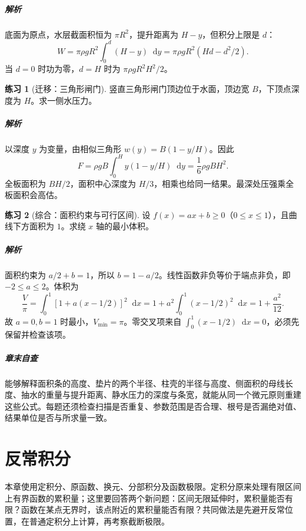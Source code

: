 \documentclass[UTF8,fontset=fandol,12pt,oneside,openany]{ctexrep}
\newcommand{\dd}{\mathop{}\!\mathrm d}
\theoremstyle{definition}
\newtheorem{exercise}{练习}[chapter]
\begin{document}
\paragraph{解析}底面为原点，水层截面积恒为 $\pi R^2$，提升距离为 $H-y$，但积分上限是 $d$：
\[
 W=\pi\rho gR^2\int_0^d(H-y)\dd y
 =\pi\rho gR^2(Hd-d^2/2).
\]
当 $d=0$ 时功为零，$d=H$ 时为 $\pi\rho gR^2H^2/2$。

\begin{exercise}[迁移：三角形闸门]
竖直三角形闸门顶边位于水面，顶边宽 $B$，下顶点深度为 $H$。求一侧水压力。
\end{exercise}
\paragraph{解析}以深度 $y$ 为变量，由相似三角形 $w(y)=B(1-y/H)$。因此
\[
 F=\rho gB\int_0^Hy(1-y/H)\dd y
 =\frac16\rho gBH^2.
\]
全板面积为 $BH/2$，面积中心深度为 $H/3$，相乘也给同一结果。最深处压强乘全板面积会高估。

\begin{exercise}[综合：面积约束与可行区间]
设 $f(x)=ax+b\ge0$（$0\le x\le1$），且曲线下方面积为 $1$。求绕 $x$ 轴的最小体积。
\end{exercise}
\paragraph{解析}面积约束为 $a/2+b=1$，所以 $b=1-a/2$。线性函数非负等价于端点非负，即 $-2\le a\le2$。体积为
\[
 \frac V\pi=\int_0^1[1+a(x-1/2)]^2\dd x
 =1+a^2\int_0^1(x-1/2)^2\dd x=1+\frac{a^2}{12}.
\]
故 $a=0,b=1$ 时最小，$V_{\min}=\pi$。零交叉项来自 $\int_0^1(x-1/2)\dd x=0$，必须先保留并检查该项。

\paragraph{章末自查}能够解释面积条的高度、垫片的两个半径、柱壳的半径与高度、侧面积的母线长度、抽水的重量与提升距离、静水压力的深度与条宽，就能从同一个微元原则重建这些公式。每题还须检查扫描是否重复、参数范围是否合理、根号是否漏绝对值、结果单位是否与所求量一致。


\chapter{反常积分}
\label{lec:13:chapter}

本章使用定积分、原函数、换元、分部积分及函数极限。定积分原来处理有限区间上有界函数的累积量；这里要回答两个新问题：区间无限延伸时，累积量能否有限？函数在某点无界时，该点附近的累积量能否有限？共同做法是先避开反常位置，在普通定积分上计算，再考察截断极限。
\end{document}

